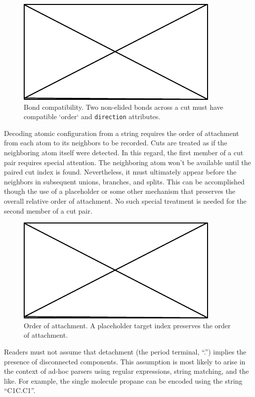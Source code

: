 \documentclass{article}
\def\ttt{\texttt}
\begin{document}
\begin{figure}
    \centering
    \includegraphics{filler}
    \caption{Bond compatibility. Two non-elided bonds across a cut must have compatible `order` and \ttt{direction} attributes.}
    \label{fig:bond-compatibility}
\end{figure}

Decoding atomic configuration from a string requires the order of attachment from each atom to its neighbors to be recorded. Cuts are treated as if the neighboring atom itself were detected. In this regard, the first member of a cut pair requires special attention. The neighboring atom won't be available until the paired cut index is found. Nevertheless, it must ultimately appear before the neighbors in subsequent unions, branches, and splits. This can be accomplished though the use of a placeholder or some other mechanism that preserves the overall relative order of attachment. No such special treatment is needed for the second member of a cut pair.

\begin{figure}
    \centering
    \includegraphics{filler}
    \caption{Order of attachment. A placeholder target index preserves the order of attachment.}
    \label{fig:order-of-attachment}
\end{figure}

Readers must not assume that detachment (the period terminal, \enquote{.}) implies the presence of disconnected components. This assumption is most likely to arise in the context of ad-hoc parsers using regular expressions, string matching, and the like. For example, the single molecule propane can be encoded using the string \enquote{C1C.C1}.
\end{document}
